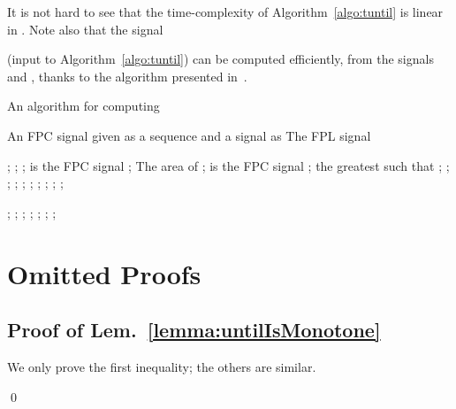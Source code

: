 \documentclass[envcountsect,orivec]{llncs} \usepackage{etex} \usepackage[]{graphicx}
\def\myqed{\qed}
\begin{document}
It is not hard to see that the time-complexity of
Algorithm~\ref{algo:tuntil} is linear in . Note also that the signal
 
(input to Algorithm~\ref{algo:tuntil}) can be computed
efficiently, from  
the signals  and ,
thanks to the algorithm presented in~\cite{DBLP:conf/cav/DonzeFM13}.
\begin{algorithm}
  \caption{An algorithm for computing }
  \label{algo:tuntil}
  \begin{algorithmic}
    \Require An FPC signal  
    given as a sequence 
    and a signal  
    as 
    \Ensure The FPL signal
    
    \State ;
    \State ;
    \State ; 
    \Comment  is the FPC signal 
\State ;
    \Comment The area of 
    \State ; 
    \Comment  is the FPC signal 
    \While{}
    \State ;
    \State  the greatest  such that 
    \State \qquad \qquad 
    ;
\State ; 
    \State ;
\State ; 
    \State ;
    \State ;
    \State ;
    \State ;
    \State ;
    \State ;

    \State ; 
    \State ;
    \State ;
    \State ;
    \State ;
    \State ;
    \State ;
\State 
\EndWhile
  \end{algorithmic}
\end{algorithm}





\section{Omitted Proofs}
\subsection{Proof of Lem.~\ref{lemma:untilIsMonotone}}
\begin{myproof}
  We only prove the first inequality; the others are similar.

  \myqed
\end{myproof}
\end{document}
